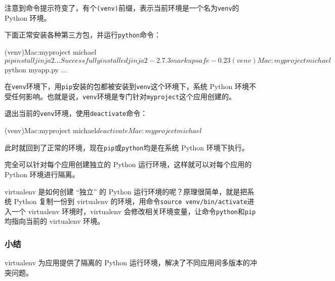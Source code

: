 注意到命令提示符变了，有个\texttt{(venv)}前缀，表示当前环境是一个名为\texttt{venv}的
Python 环境。

下面正常安装各种第三方包，并运行\texttt{python}命令：

\begin{pythoncode}
(venv)Mac:myproject michael$ pip install jinja2
...
Successfully installed jinja2-2.7.3 markupsafe-0.23
(venv)Mac:myproject michael$ python myapp.py
...
\end{pythoncode}

在\texttt{venv}环境下，用\texttt{pip}安装的包都被安装到\texttt{venv}这个环境下，系统
Python
环境不受任何影响。也就是说，\texttt{venv}环境是专门针对\texttt{myproject}这个应用创建的。

退出当前的\texttt{venv}环境，使用\texttt{deactivate}命令：

\begin{pythoncode}
(venv)Mac:myproject michael$ deactivate 
Mac:myproject michael$ 
\end{pythoncode}

此时就回到了正常的环境，现在\texttt{pip}或\texttt{python}均是在系统
Python 环境下执行。

完全可以针对每个应用创建独立的 Python 运行环境，这样就可以对每个应用的
Python 环境进行隔离。

virtualenv 是如何创建 ``独立'' 的 Python
运行环境的呢？原理很简单，就是把系统 Python 复制一份到 virtualenv
的环境，用命令\texttt{source\ venv/bin/activate}进入一个 virtualenv
环境时，virtualenv
会修改相关环境变量，让命令\texttt{python}和\texttt{pip}均指向当前的
virtualenv 环境。

\hypertarget{ux5c0fux7ed3}{%
\subsubsection{小结}\label{ux5c0fux7ed3}}

virtualenv 为应用提供了隔离的 Python
运行环境，解决了不同应用间多版本的冲突问题。

